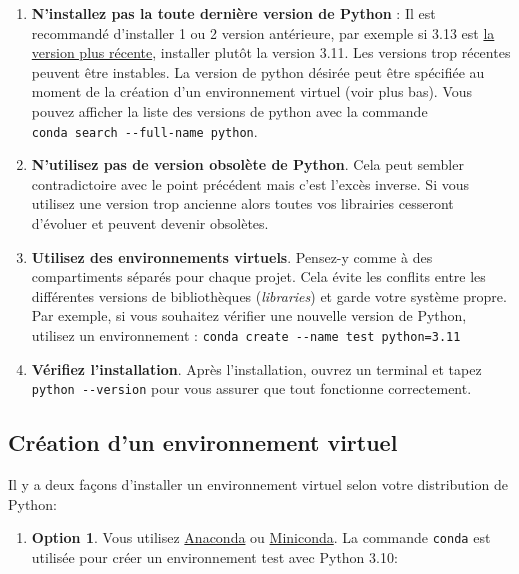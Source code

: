 \documentclass[
  french,
  11pt,
  letterpaper,
  open=any,
  twoside=false,
  french]{scrbook}
\providecommand{\tightlist}{%
  \setlength{\itemsep}{0pt}\setlength{\parskip}{0pt}}
\begin{document}
\begin{enumerate}
\def\labelenumi{\arabic{enumi}.}
\item
  \textbf{N'installez pas la toute dernière version de Python} : Il est
  recommandé d'installer 1 ou 2 version antérieure, par exemple si 3.13
  est \href{https://www.python.org/downloads/}{la version plus récente},
  installer plutôt la version 3.11. Les versions trop récentes peuvent
  être instables. La version de python désirée peut être spécifiée au
  moment de la création d'un environnement virtuel (voir plus bas). Vous
  pouvez afficher la liste des versions de python avec la commande
  \texttt{conda\ search\ -\/-full-name\ python}.
\item
  \textbf{N'utilisez pas de version obsolète de Python}. Cela peut
  sembler contradictoire avec le point précédent mais c'est l'excès
  inverse. Si vous utilisez une version trop ancienne alors toutes vos
  librairies cesseront d'évoluer et peuvent devenir obsolètes.
\item
  \textbf{Utilisez des environnements virtuels}. Pensez-y comme à des
  compartiments séparés pour chaque projet. Cela évite les conflits
  entre les différentes versions de bibliothèques (\emph{libraries}) et
  garde votre système propre. Par exemple, si vous souhaitez vérifier
  une nouvelle version de Python, utilisez un environnement :
  \texttt{conda\ create\ -\/-name\ test\ python=3.11}
\item
  \textbf{Vérifiez l'installation}. Après l'installation, ouvrez un
  terminal et tapez \texttt{python\ -\/-version} pour vous assurer que
  tout fonctionne correctement.
\end{enumerate}

\subsection{Création d'un environnement virtuel}\label{sec-00-01}

Il y a deux façons d'installer un environnement virtuel selon votre
distribution de Python:

\begin{enumerate}
\def\labelenumi{\arabic{enumi}.}
\tightlist
\item
  \textbf{Option 1}. Vous utilisez
  \href{https://www.anaconda.com/download}{Anaconda} ou
  \href{https://docs.anaconda.com/miniconda/miniconda-install/}{Miniconda}.
  La commande \texttt{conda} est utilisée pour créer un environnement
  test avec Python 3.10:
\end{enumerate}
\end{document}

